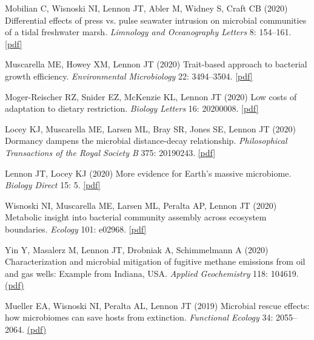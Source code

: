 \documentclass[11pt]{article}
\begin{document}
\begin{etaremune}
\item Mobilian C, Wisnoski NI, Lennon JT, Abler M, Widney S, Craft CB (2020) Differential effects of press vs. pulse seawater intrusion on microbial communities of a tidal freshwater marsh. \textit{Limnology and Oceanography Letters} 8: 154–161. \href{https://lennonlab.github.io/assets/publications/Mobilian_etal_2020.pdf}{[pdf]}

\item Muscarella ME, Howey XM, Lennon JT (2020) Trait-based approach to bacterial growth efficiency. \textit{Environmental Microbiology} 22: 3494–3504. \href{https://lennonlab.github.io/assets/publications/Muscarella_etal_2020.pdf}{[pdf]}

\item Moger-Reischer RZ, Snider EZ, McKenzie KL, Lennon JT (2020) Low costs of adaptation to dietary restriction. \textit{Biology Letters} 16: 20200008. \href{https://lennonlab.github.io/assets/publications/Moger-Reischer_etal_2020.pdf}{[pdf]}

\item Locey KJ, Muscarella ME, Larsen ML, Bray SR, Jones SE, Lennon JT (2020) Dormancy dampens the microbial distance-decay relationship. \textit{Philosophical Transactions of the Royal Society B} 375: 20190243. \href{https://lennonlab.github.io/assets/publications/Locey_etal_2020.pdf}{[pdf]}

\item Lennon JT, Locey KJ (2020) More evidence for Earth's massive microbiome. \textit{Biology Direct} 15: 5. \href{https://lennonlab.github.io/assets/publications/Lennon_Locey_2020.pdf}{[pdf]}

\item Wisnoski NI, Muscarella ME, Larsen ML, Peralta AP, Lennon JT (2020) Metabolic insight into bacterial community assembly across ecosystem boundaries. \textit{Ecology} 101: e02968. \href{https://lennonlab.github.io/assets/publications/Wisnoski_etal_2020.pdf}{[pdf]}

\item Yin Y, Masalerz M, Lennon JT, Drobniak A, Schimmelmann A (2020) Characterization and microbial mitigation of fugitive methane emissions from oil and gas wells: Example from Indiana, USA. \textit{Applied Geochemistry} 118: 104619. \href{https://lennonlab.github.io/assets/publications/Yin_etal_2020.pdf}{(pdf)}

\item Mueller EA, Wisnoski NI, Peralta AL, Lennon JT (2019) Microbial rescue effects: how microbiomes can save hosts from extinction. \textit{Functional Ecology} 34: 2055--2064. \href{https://lennonlab.github.io/assets/publications/Mueller_etal_2019.pdf}{(pdf)}


\end{etaremune}
\end{document}

